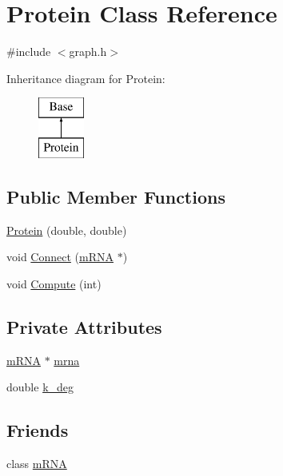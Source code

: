 \hypertarget{class_protein}{\section{Protein Class Reference}
\label{class_protein}
}


{\ttfamily \#include $<$graph.\-h$>$}

Inheritance diagram for Protein\-:\begin{figure}[H]
\begin{center}
\leavevmode
\includegraphics[height=2.000000cm]{class_protein}
\end{center}
\end{figure}
\subsection*{Public Member Functions}
\begin{DoxyCompactItemize}
\item 
\hyperlink{class_protein_a9f0a706232fd3e68c15263e2102fec02}{Protein} (double, double)
\item 
void \hyperlink{class_protein_a52cf8da9e08eeb67b44114af2d12f45c}{Connect} (\hyperlink{classm_r_n_a}{m\-R\-N\-A} $\ast$)
\item 
void \hyperlink{class_protein_af977204f0e2ffe5544bcab971d5eeb0d}{Compute} (int)
\end{DoxyCompactItemize}
\subsection*{Private Attributes}
\begin{DoxyCompactItemize}
\item 
\hyperlink{classm_r_n_a}{m\-R\-N\-A} $\ast$ \hyperlink{class_protein_a28268d2851fd44eee68754d45301d6e1}{mrna}
\item 
double \hyperlink{class_protein_a21c7f43c3a4e313b02e93f8b682a2074}{k\-\_\-deg}
\end{DoxyCompactItemize}
\subsection*{Friends}
\begin{DoxyCompactItemize}
\item 
class \hyperlink{class_protein_a904bf77ec17baad950eb63ea5c40c6ea}{m\-R\-N\-A}
\end{DoxyCompactItemize}
